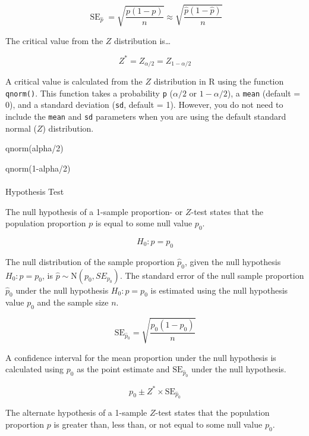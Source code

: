 \documentclass[
  letterpaper,
  DIV=11,
  numbers=noendperiod]{scrartcl}
\makeatletter
\let\oldparagraph\paragraph
\renewcommand{\paragraph}{
    \@ifstar
      \xxxParagraphStar
      \xxxParagraphNoStar
  }
\newcommand{\xxxParagraphStar}[1]{\oldparagraph*{#1}\mbox{}}
\newcommand{\xxxParagraphNoStar}[1]{\oldparagraph{#1}\mbox{}}
\newenvironment{Shaded}{\begin{snugshade}}{\end{snugshade}}
\newcommand{\DecValTok}[1]{\textcolor[rgb]{0.68,0.00,0.00}{#1}}
\newcommand{\FunctionTok}[1]{\textcolor[rgb]{0.28,0.35,0.67}{#1}}
\newcommand{\NormalTok}[1]{\textcolor[rgb]{0.00,0.23,0.31}{#1}}
\newcommand{\SpecialCharTok}[1]{\textcolor[rgb]{0.37,0.37,0.37}{#1}}
\makeatother
\begin{document}
\[
\operatorname{SE}_{\hat{p}}=\sqrt{\frac{p(1-p)}{n}}\approx\sqrt{\frac{\hat{p}(1-\hat{p})}{n}}
\]

The critical value from the \(Z\) distribution is\ldots{}

\[
Z^*=Z_{\alpha/2}=Z_{1-\alpha/2}
\]

A critical value is calculated from the \(Z\) distribution in R using
the function \texttt{qnorm()}. This function takes a probability
\texttt{p} (\(\alpha/2\) or \(1-\alpha/2\)), a \texttt{mean} (default =
0), and a standard deviation (\texttt{sd}, default = 1). However, you do
not need to include the \texttt{mean} and \texttt{sd} parameters when
you are using the default standard normal (\(Z\)) distribution.

\begin{Shaded}
\begin{Highlighting}[]
\FunctionTok{qnorm}\NormalTok{(alpha}\SpecialCharTok{/}\DecValTok{2}\NormalTok{)}

\FunctionTok{qnorm}\NormalTok{(}\DecValTok{1}\SpecialCharTok{{-}}\NormalTok{alpha}\SpecialCharTok{/}\DecValTok{2}\NormalTok{)}
\end{Highlighting}
\end{Shaded}

\paragraph{Hypothesis Test}\label{hypothesis-test-3}

The null hypothesis of a 1-sample proportion- or \(Z\)-test states that
the population proportion \(p\) is equal to some null value \(p_0\).

\[
H_0 \colon p=p_0
\]

The null distribution of the sample proportion \(\hat{p}_0\), given the
null hypothesis \(H_0 \colon p=p_0\), is
\(\hat{p} \sim \text{N}\left(p_0, SE_{p_0}\right)\). The standard error
of the null sample proportion \(\hat{p}_0\) under the null hypothesis
\(H_0 \colon p=p_0\) is estimated using the null hypothesis value
\(p_0\) and the sample size \(n\).

\[
\text{SE}_{\hat{p}_0}=\sqrt{\frac{p_0(1-p_0)}{n}}
\]

A confidence interval for the mean proportion under the null hypothesis
is calculated using \(p_0\) as the point estimate and
\(\text{SE}_{\hat{p}_0}\) under the null hypothesis.

\[
p_0 \pm Z^* \times \text{SE}_{\hat{p}_0}
\]

The alternate hypothesis of a 1-sample \(Z\)-test states that the
population proportion \(p\) is greater than, less than, or not equal to
some null value \(p_0\).
\end{document}
